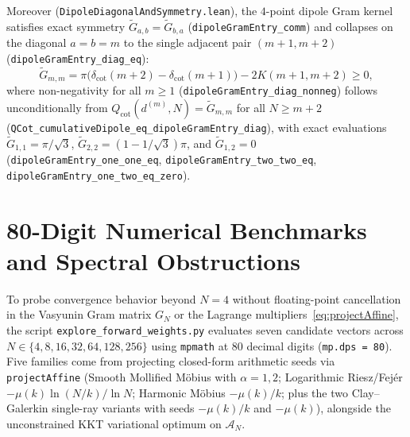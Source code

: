 \documentclass[11pt,a4paper]{article}
\theoremstyle{definition}
\begin{document}
Moreover (\texttt{Dipole\allowbreak Diagonal\allowbreak And\allowbreak Symmetry.lean}), the $4$-point dipole Gram kernel satisfies exact symmetry $\widetilde{G}_{a,b} = \widetilde{G}_{b,a}$ (\texttt{dipole\allowbreak Gram\allowbreak Entry\_\allowbreak comm}) and collapses on the diagonal $a = b = m$ to the single adjacent pair $(m+1, m+2)$ (\texttt{dipole\allowbreak Gram\allowbreak Entry\_\allowbreak diag\_\allowbreak eq}):
\begin{equation}
\widetilde{G}_{m,m} = \pi\big(\delta_{\mathrm{cot}}(m+2) - \delta_{\mathrm{cot}}(m+1)\big) - 2 K(m+1, m+2) \ge 0,
\end{equation}
where non-negativity for all $m \ge 1$ (\texttt{dipole\allowbreak Gram\allowbreak Entry\_\allowbreak diag\_\allowbreak nonneg}) follows unconditionally from $Q_{\mathrm{cot}}(d^{(m)}, N) = \widetilde{G}_{m,m}$ for all $N \ge m + 2$ (\texttt{QCot\_\allowbreak cumulative\allowbreak Dipole\_\allowbreak eq\_\allowbreak dipole\allowbreak Gram\allowbreak Entry\_\allowbreak diag}), with exact evaluations $\widetilde{G}_{1,1} = \pi/\sqrt{3}$, $\widetilde{G}_{2,2} = (1 - 1/\sqrt{3})\pi$, and $\widetilde{G}_{1,2} = 0$ (\texttt{dipole\allowbreak Gram\allowbreak Entry\_\allowbreak one\_\allowbreak one\_\allowbreak eq}, \texttt{dipole\allowbreak Gram\allowbreak Entry\_\allowbreak two\_\allowbreak two\_\allowbreak eq}, \texttt{dipole\allowbreak Gram\allowbreak Entry\_\allowbreak one\_\allowbreak two\_\allowbreak eq\_\allowbreak zero}).

\section{80-Digit Numerical Benchmarks and Spectral Obstructions}\label{sec:benchmark}

To probe convergence behavior beyond $N = 4$ without floating-point cancellation in the Vasyunin Gram matrix $G_N$ or the Lagrange multipliers~\eqref{eq:projectAffine}, the script \texttt{explore\_forward\_weights.py} evaluates seven candidate vectors across $N \in \{4, 8, 16, 32, 64, 128, 256\}$ using \texttt{mpmath} at $80$ decimal digits (\texttt{mp.dps = 80}). Five families come from projecting closed-form arithmetic seeds via \texttt{projectAffine} (Smooth Mollified M\"obius with $\alpha = 1, 2$; Logarithmic Riesz/Fej\'er $-\mu(k)\ln(N/k)/\ln N$; Harmonic M\"obius $-\mu(k)/k$; plus the two Clay--Galerkin single-ray variants with seeds $-\mu(k)/k$ and $-\mu(k)$), alongside the unconstrained KKT variational optimum on $\mathcal{A}_N$.
\end{document}
